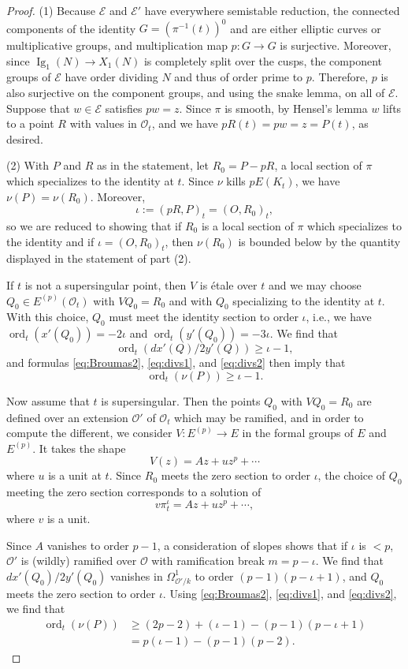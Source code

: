 \documentclass[10pt,a4paper]{amsart}
\DeclareMathOperator{\Ig}{Ig}
\DeclareMathOperator{\ord}{ord}
\newcommand{\EE}{\mathcal{E}}
\newcommand{\OO}{\mathcal{O}}
\begin{document}
\begin{proof}
  (1) Because $\EE$ and $\EE'$ have everywhere semistable reduction,
  the connected components of the identity
  $G=\left(\pi^{-1}(t)\right)^0$ and are either elliptic curves or
  multiplicative groups, and multiplication map $p:G\to G$ is
  surjective.  Moreover, since $\Ig_1(N)\to X_1(N)$ is completely
  split over the cusps, the component groups of $\EE$ have order
  dividing $N$ and thus of order prime to $p$.  Therefore, $p$ is also
  surjective on the component groups, and using the snake lemma, on
  all of $\EE$.  Suppose that $w\in \EE$ satisfies $pw=z$.  Since
  $\pi$ is smooth, by Hensel's lemma $w$ lifts to a point $R$ with
  values in $\OO_{t}$, and we have $pR(t)=pw=z=P(t)$, as desired. 

  (2) With $P$ and $R$ as in the statement, let $R_0=P-pR$, a local
  section of $\pi$ which specializes to the identity at $t$.  Since
  $\nu$ kills $pE(K_t)$, we have $\nu(P)=\nu(R_0)$.  Moreover,
  \[\iota:=(pR,P)_t=(O,R_0)_t,\] %
  so we are reduced to showing that if $R_0$ is a local section of
  $\pi$ which specializes to the identity and if $\iota=(O,R_0)_t$,
  then $\nu(R_0)$ is bounded below by the quantity displayed in the
  statement of part (2).

  If $t$ is not a supersingular point, then $V$ is \'etale over $t$
  and we may choose $Q_0\in E^{(p)}(\OO_t)$ with $VQ_0=R_0$ and with
  $Q_0$ specializing to the identity at $t$.  With this choice, $Q_0$
  must meet the identity section to order $\iota$, i.e., we have
  $\ord_t(x'(Q_0))=-2\iota$ and $\ord_t(y'(Q_0))=-3\iota$.  We find
  that
\[\ord_t(dx'(Q)/2y'(Q))\ge \iota-1,\]
and formulas \eqref{eq:Broumas2}, \eqref{eq:divs1}, and
\eqref{eq:divs2} then imply that
\[\ord_t(\nu(P))\ge \iota-1.\]

Now assume that $t$ is supersingular.  Then the points $Q_0$ with
$VQ_0=R_0$ are defined over an extension $\OO'$ of $\OO_t$ which may
be ramified, and in order to compute the different, we consider
$V:E^{(p)}\to E$ in the formal groups of $E$ and $E^{(p)}$.  It takes
the shape
\[ V(z)=Az+uz^p+\cdots\] %
where $u$ is a unit at $t$.  Since $R_0$ meets the zero section to
order $\iota$, the choice of $Q_0$ meeting the zero section
corresponds to a solution of
\[v\pi_t^\iota=Az+uz^p+\cdots,\] %
where $v$ is a unit.

Since $A$ vanishes to order $p-1$, a consideration of slopes shows
that if $\iota$ is $<p$, $\OO'$ is (wildly) ramified over $\OO$ with
ramification break $m=p-\iota$.  We find that $dx'(Q_0)/2y'(Q_0)$
vanishes in $\Omega^1_{\OO'/k}$ to order $(p-1)(p-\iota+1)$, and
$Q_0$ meets the zero section to order $\iota$.  Using
\eqref{eq:Broumas2}, \eqref{eq:divs1}, and \eqref{eq:divs2}, we find
that
\begin{align*}
  \ord_t(\nu(P))&\ge (2p-2)+(\iota-1)-(p-1)(p-\iota+1)\\
  &=p(\iota-1)-(p-1)(p-2).
\end{align*}


\end{proof}
\end{document}
